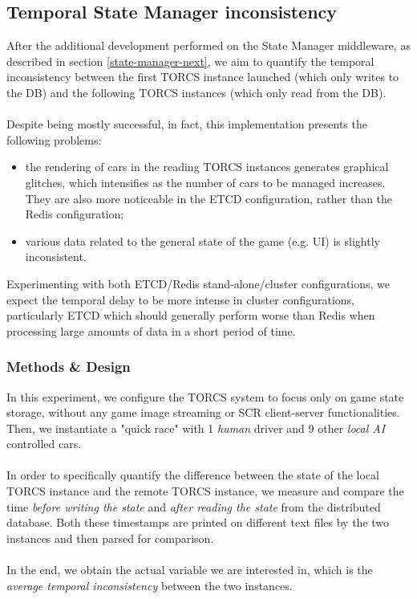 \subsection{Temporal State Manager inconsistency}\label{ex:temp-state-inconsistency}
After the additional development performed on the State Manager middleware, as described in section \ref{state-manager-next}, we aim to quantify the temporal inconsistency between the first TORCS instance launched (which only writes to the DB) and the following TORCS instances (which only read from the DB). \\ \\
Despite being mostly successful, in fact, this implementation presents the following problems:
\begin{itemize}
	\item the rendering of cars in the reading TORCS instances generates graphical glitches, which intensifies as the number of cars to be managed increases. They are also more noticeable in the ETCD configuration, rather than the Redis configuration;
	\item various data related to the general state of the game (e.g. UI) is slightly inconsistent.
\end{itemize}
Experimenting with both ETCD/Redis stand-alone/cluster configurations, we expect the temporal delay to be more intense in cluster configurations, particularly ETCD which should generally perform worse than Redis when processing large amounts of data in a short period of time.
\subsubsection{Methods \& Design}
In this experiment, we configure the TORCS system to focus only on game state storage, without any game image streaming or SCR client-server functionalities. Then, we instantiate a "quick race" with 1 \textit{human} driver and 9 other \textit{local AI} controlled cars. \\ \\
In order to specifically quantify the difference between the state of the local TORCS instance and the remote TORCS instance, we measure and compare the time \textit{before writing the state} and \textit{after reading the state} from the distributed database. Both these timestamps are printed on different text files by the two instances and then parsed for comparison. \\ \\
In the end, we obtain the actual variable we are interested in, which is the \textit{average temporal inconsistency} between the two instances.

